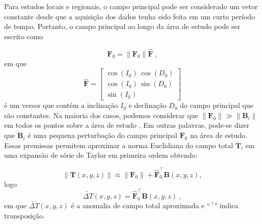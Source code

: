 Para estudos locais e regionais, o campo principal pode ser considerado um vetor constante desde que a aquisição dos dados tenha sido feita em um curto período de tempo. Portanto, o campo principal ao longo da área de estudo pode ser escrito como

\begin{equation}
\mathbf{F}_{0} = \| \mathbf{F}_{0} \| \hat{\mathbf{F}} \: ,
\label{eq:geomagnetic_field_F0}
\end{equation}
em que
\begin{equation}
\hat{\mathbf{F}} = \left[
\begin{array}{c}
\cos(I_{0}) \, \cos(D_{0}) \\
\cos(I_{0}) \, \sin(D_{0}) \\
\sin(I_{0})
\end{array} \right]
\label{eq:unit_vector_F}
\end{equation}
é um versor que contém a inclinação $I_{0}$ e declinação $D_{0}$ do campo principal que são constantes.
Na maioria dos casos, podemos considerar que $\|\mathbf{F}_0\| \gg \| \mathbf{B}_i \|$ em todos os pontos sobre a área de estudo \citep{blakely1996}.
Em outras palavras, pode-se dizer que $\mathbf{B}_i$ é uma pequena perturbação do campo principal $\mathbf{F}_0$ na área de estudo. Essas premissas permitem aproximar a norma Euclidiana do campo total $\mathbf{T}_i$ em uma expansão de série de Taylor em primeira ordem obtendo:

\begin{equation}\label{eq:taylorexp}
\|\mathbf{T}(x, y, z)\| \approx \|\mathbf{F}_0\| + \hat{\mathbf{F}}_0^{\top}\mathbf{B}(x, y, z) ,
\end{equation}
logo
\begin{equation}
\tilde{\Delta T}(x, y, z) = \hat{\mathbf{F}}^{\top}_0 \mathbf{B}(x, y, z) \: ,
\label{eq:tfanomaly}
\end{equation}
em que $ \tilde{\Delta T}(x, y, z) $ é a anomalia de campo total aproximada e ``$ ^\top $" indica transposição.

